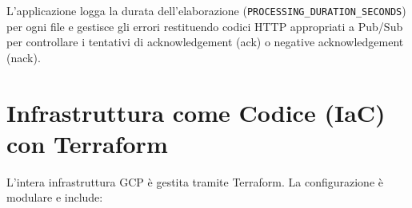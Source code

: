 \documentclass[11pt, a4paper]{article}
\begin{document}
L'applicazione logga la durata dell'elaborazione (\texttt{PROCESSING\_DURATION\_SECONDS}) per ogni file e gestisce gli errori restituendo codici HTTP appropriati a Pub/Sub per controllare i tentativi di acknowledgement (ack) o negative acknowledgement (nack).

\section{Infrastruttura come Codice (IaC) con Terraform}
\label{sec:iac_terraform}

L'intera infrastruttura GCP è gestita tramite Terraform. La configurazione è modulare e include:
\end{document}
